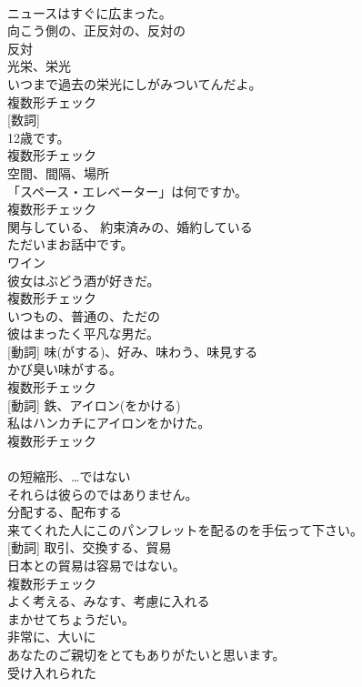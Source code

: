 \documentclass[8pt]{extreport}
\begin{document}
\begin{CJK}{UTF8}{min}
\\	ニュースはすぐに広まった。	
\\	[形容詞]	向こう側の、正反対の、反対の	
\\	反対	
\\	[名詞]	光栄、栄光	
\\	いつまで過去の栄光にしがみついてんだよ。	
\\	複数形チェック
\\	[名詞] [数詞]	
\\	12歳です。	
\\	複数形チェック
\\	[名詞]	空間、間隔、場所	
\\	「スペース・エレベーター」は何ですか。	
\\	複数形チェック
\\	[形容詞]	関与している、 約束済みの、婚約している	
\\	ただいまお話中です。	
\\	[名詞]	ワイン	
\\	彼女はぶどう酒が好きだ。	
\\	複数形チェック
\\	[形容詞]	いつもの、普通の、ただの	
\\	彼はまったく平凡な男だ。	
\\	[名詞] [動詞]	味(がする)、好み、味わう、味見する	
\\	かび臭い味がする。	
\\	複数形チェック
\\	[名詞] [動詞]	鉄、アイロン(をかける)	
\\	私はハンカチにアイロンをかけた。	
\\	複数形チェック
\\	[短縮形]	
\\	の短縮形、…ではない	
\\	それらは彼らのではありません。	
\\	[動詞]	分配する、配布する	
\\	来てくれた人にこのパンフレットを配るのを手伝って下さい。	
\\	[名詞] [動詞]	取引、交換する、貿易	
\\	日本との貿易は容易ではない。	
\\	複数形チェック
\\	[動詞]	よく考える、みなす、考慮に入れる	
\\	まかせてちょうだい。	
\\	[副詞]	非常に、大いに	
\\	あなたのご親切をとてもありがたいと思います。	
\\	[形容詞]	受け入れられた	

\end{CJK}
\end{document}

